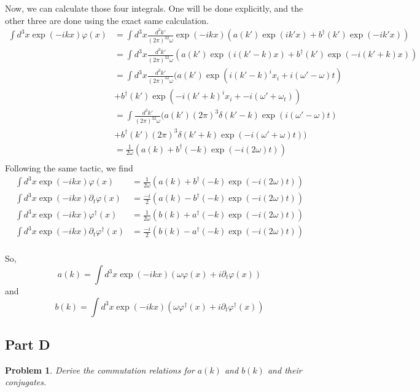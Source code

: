 \documentclass[fontsize=11pt]{scrartcl} %
\numberwithin{equation}{section} %
\numberwithin{figure}{section} %
\numberwithin{table}{section} %
\newtheorem*{problem}{Problem}
\begin{document}
Now, we can calculate those four integrals. One will be done explicitly, and the
other three are done using the exact same calculation.
\[
    \begin{aligned}
        \int d^3x\exp(-ikx)\varphi(x) 
        &=
        \int d^3x\frac{d^3k'}{(2\pi)^32\omega}\exp(-ikx)\left(
        a(k')\exp(ik'x) + b^{\dagger}(k')\exp(-ik'x)\right)\\
        &=
        \int d^3x\frac{d^3k'}{(2\pi)^32\omega}\left(
        a(k')\exp(i(k'-k)x) + b^{\dagger}(k')\exp(-i(k'+k)x)\right)\\
        &=
        \int d^3x\frac{d^3k'}{(2\pi)^32\omega}(
        a(k')\exp(i(k'-k)^ix_i + i(\omega'-\omega)t)\\
        &+ b^{\dagger}(k')\exp(-i(k'+k)^ix_i +
        -i(\omega'+\omega_t))\\
        &=
        \int \frac{d^3k'}{(2\pi)^32\omega}(
        a(k')(2\pi)^3\delta(k'-k)\exp(i(\omega'-\omega)t)\\
        &+ b^{\dagger}(k')(2\pi)^3\delta(k'+k)\exp(-i(\omega'+\omega)t))\\
        &=
        \frac{1}{2\omega}(
        a(k) + b^{\dagger}(-k)\exp(-i(2\omega)t))\\
    \end{aligned}
\]
Following the same tactic, we find
\[
    \begin{aligned}
        \int d^3x\exp(-ikx)\varphi(x) 
        &= \frac{1}{2\omega}(a(k) + b^{\dagger}(-k)\exp(-i(2\omega)t))\\
        \int d^3x\exp(-ikx)\partial_t\varphi(x)
        &= \frac{-i}{2}(a(k) - b^{\dagger}(-k)\exp(-i(2\omega)t))\\
        \int d^3x\exp(-ikx)\varphi^{\dagger}(x)
        &= \frac{1}{2\omega}(b(k) + a^{\dagger}(-k)\exp(-i(2\omega)t))\\
        \int d^3x\exp(-ikx)\partial_t\varphi^{\dagger}(x)
        &= \frac{-i}{2}(b(k) - a^{\dagger}(-k)\exp(-i(2\omega)t))\\
    \end{aligned}
\]

So,
\[
    a(k) = \int d^3x\exp(-ikx)\left( \omega\varphi(x) + i\partial_t\varphi(x)\right)
\]
and
\[
    b(k) =\int d^3x\exp(-ikx)\left( \omega\varphi^{\dagger}(x) +
    i\partial_t\varphi^{\dagger}(x)\right)
\]

\newpage
\subsection*{Part D}
\begin{problem}
    Derive the commutation relations for $a(k)$ and $b(k)$ and their conjugates.
\end{problem}
\end{document}
